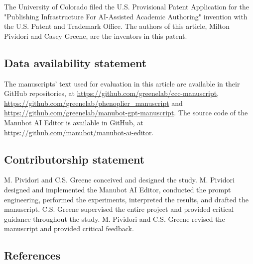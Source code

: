 \documentclass[
]{article}
\begin{document}
The University of Colorado filed the U.S. Provisional Patent Application for the "Publishing Infrastructure For AI-Assisted Academic Authoring" invention with the U.S. Patent and Trademark Office.
The authors of this article, Milton Pividori and Casey Greene, are the inventors in this patent.

\hypertarget{data-availability-statement}{%
\subsection{Data availability statement}\label{data-availability-statement}}

The manuscripts' text used for evaluation in this article are available in their GitHub repositories, at \url{https://github.com/greenelab/ccc-manuscript}, \url{https://github.com/greenelab/phenoplier_manuscript} and \url{https://github.com/greenelab/manubot-gpt-manuscript}.
The source code of the Manubot AI Editor is available in GitHub, at \url{https://github.com/manubot/manubot-ai-editor}.

\hypertarget{contributorship-statement}{%
\subsection{Contributorship statement}\label{contributorship-statement}}

M. Pividori and C.S. Greene conceived and designed the study.
M. Pividori designed and implemented the Manubot AI Editor, conducted the prompt engineering, performed the experiments, interpreted the results, and drafted the manuscript.
C.S. Greene supervised the entire project and provided critical guidance throughout the study.
M. Pividori and C.S. Greene revised the manuscript and provided critical feedback.

\hypertarget{references}{%
\subsection{References}\label{references}}
\end{document}
